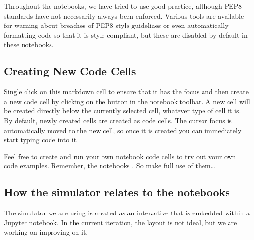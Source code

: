 \documentclass[letterpaper,10pt,english]{sphinxmanual}
\begin{document}
Throughout the notebooks, we have tried to use good practice, although PEP8 standards have not necessarily always been enforced. Various tools are available for warning about breaches of PEP8 style guidelines or even automatically formatting code so that it is style compliant, but these are disabled by default in these notebooks.



\subsection{Creating New Code Cells}
\label{\detokenize{content/00_READ_ME_FIRST/Section_00_06_RoboLab_Environment:Creating-New-Code-Cells}}
Single click on this markdown cell to ensure that it has the focus and then create a new code cell by clicking on the \sphinxcode{\sphinxupquote{+}} button in the notebook toolbar. A new cell will be created directly below the currently selected cell, whatever type of cell it is. By default, newly created cells are created as code cells. The cursor focus is automatically moved to the new cell, so once it is created you can immediately start typing code into it.

 

Feel free to create and run your own notebook code cells to try out your own code examples. Remember, the notebooks . So make full use of them…


\subsection{How the simulator relates to the notebooks}
\label{\detokenize{content/00_READ_ME_FIRST/Section_00_06_RoboLab_Environment:How-the-simulator-relates-to-the-notebooks}}
The simulator we are using is created as an interactive  that is embedded within a Jupyter notebook. In the current iteration, the layout is not ideal, but we are working on improving on it.
\end{document}
